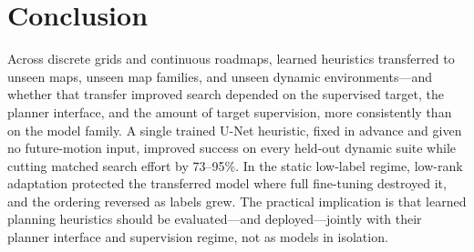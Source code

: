 \documentclass[letterpaper]{article} %
\begin{document}
\section{Conclusion}

Across discrete grids and continuous roadmaps, learned heuristics transferred to unseen maps, unseen map families, and unseen dynamic environments---and whether that transfer improved search depended on the supervised target, the planner interface, and the amount of target supervision, more consistently than on the model family. A single trained U-Net heuristic, fixed in advance and given no future-motion input, improved success on every held-out dynamic suite while cutting matched search effort by 73--95\%. In the static low-label regime, low-rank adaptation protected the transferred model where full fine-tuning destroyed it, and the ordering reversed as labels grew. The practical implication is that learned planning heuristics should be evaluated---and deployed---jointly with their planner interface and supervision regime, not as models in isolation.



\end{document}
